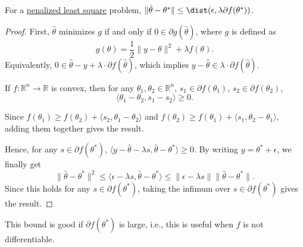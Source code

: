 \begin{lemma}\label{lma:Oymak-Hassibi}
	For a \hyperref[prb:penalized-LS]{penalized least square} problem, \(\lVert \hat{\theta} - \theta ^{\ast} \rVert \leq \dist(\epsilon , \lambda \partial f(\theta ^{\ast} )) \).
\end{lemma}
\begin{proof}
	First, \(\hat{\theta} \) minimizes \(g\) if and only if \(0\in \partial g(\hat{\theta} )\), where \(g\) is defined as
	\[
		g(\theta ) = \frac{1}{2} \lVert y - \theta  \rVert ^2 + \lambda f(\theta ).
	\]
	Equivalently, \(0 \in \hat{\theta} - y + \lambda \cdot \partial f(\hat{\theta} )\), which implies \(y - \hat{\theta} \in \lambda \cdot \partial f(\hat{\theta} )\).

	\begin{claim}
		If \(f\colon \mathbb{R} ^n \to \mathbb{R} \) is convex, then for any \(\theta _1, \theta _2 \in \mathbb{R} ^n\), \(s_1 \in \partial f(\theta _1)\), \(s_2 \in \partial f(\theta _2)\),
		\[
			\langle \theta _1 - \theta _2, s_1 - s_2 \rangle \geq 0.
		\]
	\end{claim}
	\begin{explanation}
		Since \(f(\theta _1) \geq f(\theta _2) + \langle s_2, \theta _1 - \theta _2 \rangle\) and \(f(\theta _2) \geq f(\theta _1) + \langle s_1, \theta _2 - \theta _1 \rangle\), adding them together gives the result.
	\end{explanation}

	Hence, for any \(s\in \partial f(\theta ^{\ast} )\), \(\langle y - \hat{\theta} - \lambda s , \hat{\theta} - \theta ^{\ast} \rangle \geq 0\). By writing \(y = \theta ^{\ast} + \epsilon \), we finally get
	\[
		\lVert \hat{\theta} - \theta ^{\ast} \rVert ^2
		\leq \langle \epsilon - \lambda s, \hat{\theta} - \theta ^{\ast}  \rangle
		\leq \lVert \epsilon - \lambda s \rVert \lVert \hat{\theta} - \theta ^{\ast} \rVert.
	\]
	Since this holds for any \(s\in \partial f(\theta ^{\ast} )\), taking the infimum over \(s\in \partial f(\theta ^{\ast} )\) gives the result.
\end{proof}

\begin{remark}
	This bound is good if \(\partial f(\theta ^{\ast} )\) is large, i.e., this is useful when \(f\) is not differentiable.
\end{remark}

